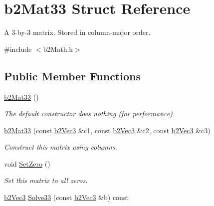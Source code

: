 \hypertarget{structb2Mat33}{}\section{b2\+Mat33 Struct Reference}
\label{structb2Mat33}


A 3-\/by-\/3 matrix. Stored in column-\/major order.  




{\ttfamily \#include $<$b2\+Math.\+h$>$}

\subsection*{Public Member Functions}
\begin{DoxyCompactItemize}
\item 
\mbox{\label{structb2Mat33_a1f4d7ddf1c8a202fc08ec64dfe191463}} 
\mbox{\hyperlink{structb2Mat33_a1f4d7ddf1c8a202fc08ec64dfe191463}{b2\+Mat33}} ()
\begin{DoxyCompactList}\small\item\em The default constructor does nothing (for performance). \end{DoxyCompactList}\item 
\mbox{\label{structb2Mat33_a36d99a037008776c8d09fe0aeb5c759c}} 
\mbox{\hyperlink{structb2Mat33_a36d99a037008776c8d09fe0aeb5c759c}{b2\+Mat33}} (const \mbox{\hyperlink{structb2Vec3}{b2\+Vec3}} \&c1, const \mbox{\hyperlink{structb2Vec3}{b2\+Vec3}} \&c2, const \mbox{\hyperlink{structb2Vec3}{b2\+Vec3}} \&c3)
\begin{DoxyCompactList}\small\item\em Construct this matrix using columns. \end{DoxyCompactList}\item 
\mbox{\label{structb2Mat33_a42fc6953b025e1c8b59717d0ee7accde}} 
void \mbox{\hyperlink{structb2Mat33_a42fc6953b025e1c8b59717d0ee7accde}{Set\+Zero}} ()
\begin{DoxyCompactList}\small\item\em Set this matrix to all zeros. \end{DoxyCompactList}\item 
\mbox{\hyperlink{structb2Vec3}{b2\+Vec3}} \mbox{\hyperlink{structb2Mat33_a2ce48f409ba5951a04da821dada9e285}{Solve33}} (const \mbox{\hyperlink{structb2Vec3}{b2\+Vec3}} \&b) const

\end{DoxyCompactItemize}
